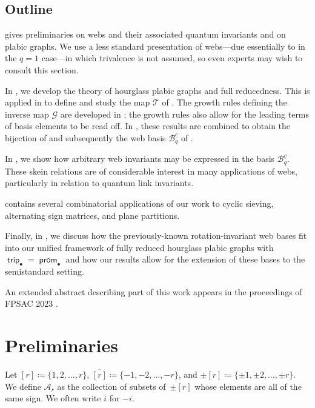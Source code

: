 \documentclass{amsart}
\theoremstyle{definition}
\theoremstyle{remark}
\numberwithin{equation}{section}
\DeclareMathOperator{\trip}{\mathsf{trip}}
\DeclareMathOperator{\prom}{\mathsf{prom}}
\begin{document}
\subsection{Outline}
 gives preliminaries on webs and their associated quantum invariants and on plabic graphs. We use a less standard presentation of webs---due essentially to \cite{Fraser-Lam-Le} in the $q=1$ case---in which trivalence is not assumed, so even experts may wish to consult this section. 

In , we develop the theory of hourglass plabic graphs and full reducedness. This is applied in  to define and study the map $\mathcal{T}$ of . The growth rules defining the inverse map $\mathcal{G}$ are developed in ; the growth rules also allow for the leading terms of basis elements to be read off. In , these results are combined to obtain the bijection of  and subsequently the web basis $\mathscr{B}_q^{\underline{c}}$ of . 

In , we show how arbitrary web invariants may be expressed in the basis $\mathscr{B}_q^{\underline{c}}$. These skein relations are of considerable interest in many applications of webs, particularly in relation to quantum link invariants.

 contains several combinatorial applications of our work to cyclic sieving, alternating sign matrices, and plane partitions.

Finally, in , we discuss how the previously-known rotation-invariant web bases fit into our unified framework of fully reduced hourglass plabic graphs with $\trip_{\bullet}=\prom_{\bullet}$ and how our results allow for the extension of these bases to the semistandard setting.

An extended abstract describing part of this work appears in the proceedings of FPSAC 2023 \cite{fpsac-abstract}.

\section{Preliminaries}
\label{sec:prelim}

Let $[r] \coloneqq \{1, 2, \dots, r\}$, $\overline{[r]} \coloneqq \{-1, -2, \dots, -r\}$, and $\pm[r]\coloneqq \{\pm1,\pm2,\ldots,\pm r\}$. We define $\mathcal{A}_r$ as the collection of subsets of~$\pm [r]$ whose elements are all of the same sign. We often write $\overline{i}$ for $-i$.  
\end{document}
